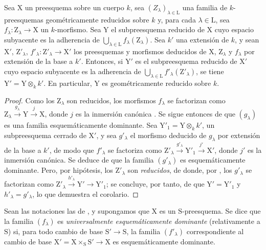 \begin{corollary}[11.10.7]
\label{IV.11.10.7}
Sea $\mathrm{X}$ un preesquema sobre un cuerpo $k$, sea $(Z_\lambda)_{\lambda\in\mathrm{L}}$ una familia de $k$-preesquemas geométricamente reducidos sobre $k$ y, para cada $\lambda\in\mathrm{L}$, sea $f_\lambda:\mathrm{Z}_\lambda\to\mathrm{X}$ un $k$-morfismo.
Sea $\mathrm{Y}$ el subpreesquema reducido de $\mathrm{X}$ cuyo espacio subyacente es la adherencia de $\bigcup_{\lambda\in\mathrm{L}}f_\lambda(\mathrm{Z}_\lambda)$.
Sea $k'$ una extensión de $k$, y sean $\mathrm{X}'$, $\mathrm{Z}'_\lambda$, $f'_\lambda:\mathrm{Z}'_\lambda\to\mathrm{X}'$ los preesquemas y morfismos deducidos de $\mathrm{X}$, $\mathrm{Z}_\lambda$ y $f_\lambda$ por extensión de la base a $k'$.
Entonces, si $\mathrm{Y}'$ es el subpreesquema reducido de $\mathrm{X}'$ cuyo espacio subyacente es la adherencia de $\bigcup_{\lambda\in\mathrm{L}}f'_\lambda(\mathrm{Z}'_\lambda)$, se tiene $\mathrm{Y}'=\mathrm{Y}\otimes_k k'$.
En particular, $\mathrm{Y}$ es geométricamente reducido sobre $k$.
\end{corollary}

\begin{proof}
Como los $\mathrm{Z}_\lambda$ son reducidos, los morfismos $f_\lambda$ se factorizan como $\mathrm{Z}_\lambda\xrightarrow{g_\lambda}\mathrm{Y}\xrightarrow{j}\mathrm{X}$, donde $j$ es la inmersión canónica .
Se sigue entonces de  que $(g_\lambda)$ es una familia esquemáticamente dominante.
Sea $\mathrm{Y}'_1=\mathrm{Y}\otimes_k k'$, un subpreesquema cerrado de $\mathrm{X}'$, y sea $g'_\lambda$ el morfismo deducido de $g_\lambda$ por extensión de la base a $k'$, de modo que $f'_\lambda$ se factoriza como $\mathrm{Z}'_\lambda\xrightarrow{g'_\lambda}\mathrm{Y}'_1\xrightarrow{j'}\mathrm{X}'$, donde $j'$ es la inmersión canónica.
Se deduce de  que la familia $(g'_\lambda)$ es esquemáticamente dominante.
Pero, por hipótesis, los $\mathrm{Z}'_\lambda$ son \emph{reducidos}, de donde, por , los $g'_\lambda$ se factorizan como $\mathrm{Z}'_\lambda\xrightarrow{h'_\lambda}\mathrm{Y}'\to\mathrm{Y}'_1$; se concluye, por tanto, de  que $\mathrm{Y}'=\mathrm{Y}'_1$ y $h'_\lambda=g'_\lambda$, lo que demuestra el corolario.
\end{proof}

\begin{definition}[11.10.8]
\label{IV.11.10.8}
Sean las notaciones las de , y supongamos que $\mathrm{X}$ es un $\mathrm{S}$-preesquema.
Se dice que la familia $(f_\lambda)$ es \emph{universalmente esquemáticamente dominante} (relativamente a $\mathrm{S}$) si, para todo cambio de base $\mathrm{S}'\to\mathrm{S}$, la familia $(f'_\lambda)$ correspondiente al cambio de base $\mathrm{X}'=\mathrm{X}\times_\mathrm{S}\mathrm{S}'\to\mathrm{X}$ es esquemáticamente dominante.
\end{definition}

